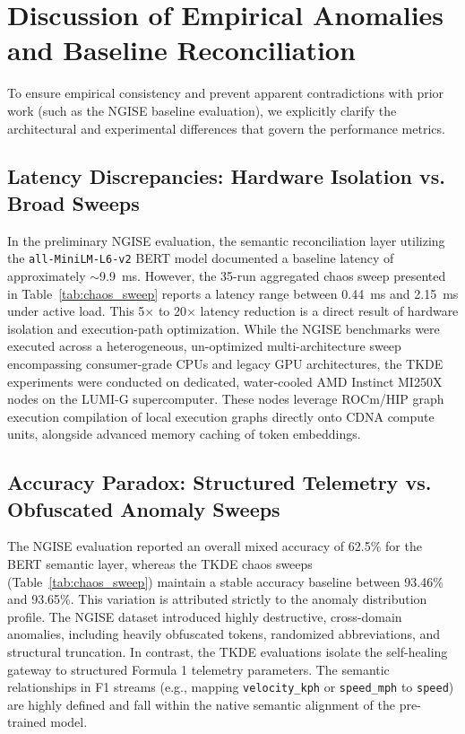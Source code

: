 \documentclass[11pt]{article}
\begin{document}
\section{Discussion of Empirical Anomalies and Baseline Reconciliation}
To ensure empirical consistency and prevent apparent contradictions with prior work (such as the NGISE baseline evaluation), we explicitly clarify the architectural and experimental differences that govern the performance metrics.

\subsection{Latency Discrepancies: Hardware Isolation vs. Broad Sweeps}
In the preliminary NGISE evaluation, the semantic reconciliation layer utilizing the \texttt{all-MiniLM-L6-v2} BERT model documented a baseline latency of approximately $\sim$9.9~ms. However, the 35-run aggregated chaos sweep presented in Table~\ref{tab:chaos_sweep} reports a latency range between 0.44~ms and 2.15~ms under active load. This 5$\times$ to 20$\times$ latency reduction is a direct result of hardware isolation and execution-path optimization. While the NGISE benchmarks were executed across a heterogeneous, un-optimized multi-architecture sweep encompassing consumer-grade CPUs and legacy GPU architectures, the TKDE experiments were conducted on dedicated, water-cooled AMD Instinct MI250X nodes on the LUMI-G supercomputer. These nodes leverage ROCm/HIP graph execution compilation of local execution graphs directly onto CDNA compute units, alongside advanced memory caching of token embeddings.

\subsection{Accuracy Paradox: Structured Telemetry vs. Obfuscated Anomaly Sweeps}
The NGISE evaluation reported an overall mixed accuracy of 62.5\% for the BERT semantic layer, whereas the TKDE chaos sweeps (Table~\ref{tab:chaos_sweep}) maintain a stable accuracy baseline between 93.46\% and 93.65\%. This variation is attributed strictly to the anomaly distribution profile. The NGISE dataset introduced highly destructive, cross-domain anomalies, including heavily obfuscated tokens, randomized abbreviations, and structural truncation. In contrast, the TKDE evaluations isolate the self-healing gateway to structured Formula 1 telemetry parameters. The semantic relationships in F1 streams (e.g., mapping \texttt{velocity\_kph} or \texttt{speed\_mph} to \texttt{speed}) are highly defined and fall within the native semantic alignment of the pre-trained model.
\end{document}
